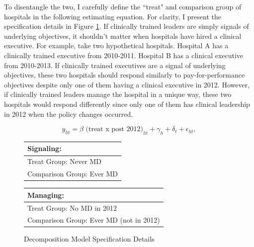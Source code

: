 \documentclass[12pt]{article}
\begin{document}
    To disentangle the two, I carefully define the ``treat" and comparison group of hospitals in the following estimating equation. For clarity, I present the specification details in Figure \ref{fig:decomp_spec}. If clinically trained leaders are simply signals of underlying objectives, it shouldn't matter when hospitals have hired a clinical executive. For example, take two hypothetical hospitals. Hospital A has a clinically trained executive from 2010-2011. Hospital B has a clinical executive from 2010-2013. If clinically trained executives are a signal of underlying objectives, these two hospitals should respond similarly to pay-for-performance objectives despite only one of them having a clinical executive in 2012. However, if clinically trained leaders manage the hospital in a unique way, these two hospitals would respond differently since only one of them has clinical leadership in 2012 when the policy changes occurred. 

    \begin{equation}
    \label{eq:decomp}
    y_{ht} = \beta \text{ (treat x post 2012)}_{ht} + \gamma_{h} + \delta_t + \epsilon_{ht},
    \end{equation}
    

\begin{figure}[ht!]
\begin{center}
\caption{\label{fig:decomp_spec}Decomposition Model Specification Details}
 
 \begin{tabular}{| m{18em} |}
 \hline
 Signaling:\\ [0.5ex]
 \hline\hline 
 \vspace{2mm}
 Treat Group:  \hspace{15mm} Never MD \\
 \vspace{2mm}
 Comparison Group: \hspace{3mm} Ever MD  \\
 [1ex]
 \hline
 \end{tabular}
\hfil   %
 \begin{tabular}{|m{18em}|}
 \hline
 Managing:\\ [0.5ex]
 \hline\hline
 \vspace{2mm}
 Treat Group: \hspace{11mm} No MD in 2012 \\
 \vspace{2mm}
 Comparison Group:  Ever MD (not in 2012)  \\
 [1ex]
 \hline
 \end{tabular}
 
\end{center}
 \end{figure}
\end{document}

